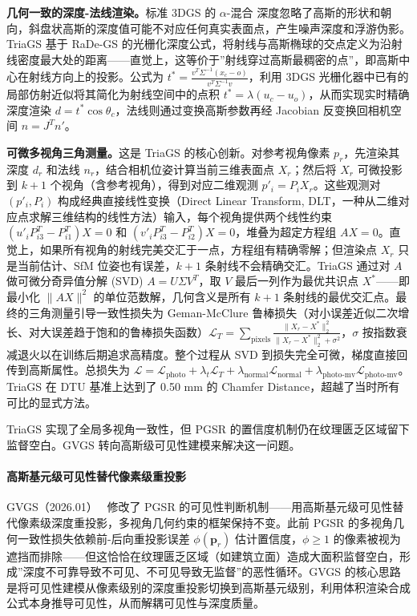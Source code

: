 \textbf{几何一致的深度-法线渲染。}标准 3DGS 的 $\alpha$-混合 深度忽略了高斯的形状和朝向，斜盘状高斯的深度值可能不对应任何真实表面点，产生噪声深度和浮游伪影。TriaGS 基于 RaDe-GS 的光栅化深度公式，将射线与高斯椭球的交点定义为沿射线密度最大处的距离——直觉上，这等价于”射线穿过高斯最稠密的点”，即高斯中心在射线方向上的投影。公式为 $t^* = \frac{v^T \Sigma^{-1}(x_c - o)}{v^T \Sigma^{-1} v}$，利用 3DGS 光栅化器中已有的局部仿射近似将其简化为射线空间中的点积 $t^* = \lambda(u_c - u_o)$，从而实现实时精确深度渲染 $d = t^* \cos\theta_c$，法线则通过变换高斯参数再经 Jacobian 反变换回相机空间 $n = J^T n'$。

\textbf{可微多视角三角测量。}这是 TriaGS 的核心创新。对参考视角像素 $p_r$，先渲染其深度 $d_r$ 和法线 $n_r$，结合相机位姿计算当前三维表面点 $X_r$；然后将 $X_r$ 可微投影到 $k+1$ 个视角（含参考视角），得到对应二维观测 $p'_i = P_i X_r$。这些观测对 $(p'_i, P_i)$ 构成经典直接线性变换（Direct Linear Transform, DLT，一种从二维对应点求解三维结构的线性方法）输入，每个视角提供两个线性约束 $(u'_i P_{i3}^T - P_{i1}^T)X = 0$ 和 $(v'_i P_{i3}^T - P_{i2}^T)X = 0$，堆叠为超定方程组 $AX = 0$。直觉上，如果所有视角的射线完美交汇于一点，方程组有精确零解；但渲染点 $X_r$ 只是当前估计、SfM 位姿也有误差，$k+1$ 条射线不会精确交汇。TriaGS 通过对 $A$ 做可微分奇异值分解 (SVD) $A = U\Sigma V^T$，取 $V$ 最后一列作为最优共识点 $X^*$——即最小化 $\|AX\|^2$ 的单位范数解，几何含义是所有 $k+1$ 条射线的最优交汇点。最终的三角测量引导一致性损失为 Geman-McClure 鲁棒损失（对小误差近似二次增长、对大误差趋于饱和的鲁棒损失函数）$\mathcal{L}_T = \sum_{\text{pixels}} \frac{\|X_r - X^*\|_2^2}{\|X_r - X^*\|_2^2 + \sigma^2}$，$\sigma$ 按指数衰减退火以在训练后期追求高精度。整个过程从 SVD 到损失完全可微，梯度直接回传到高斯属性。总损失为 $\mathcal{L} = \mathcal{L}_{\text{photo}} + \lambda_t \mathcal{L}_T + \lambda_{\text{normal}} \mathcal{L}_{\text{normal}} + \lambda_{\text{photo-mv}} \mathcal{L}_{\text{photo-mv}}$。TriaGS 在 DTU 基准上达到了 0.50 mm 的 Chamfer Distance，超越了当时所有可比的显式方法。

TriaGS 实现了全局多视角一致性，但 PGSR 的置信度机制仍在纹理匮乏区域留下监督空白。GVGS 转向高斯级可见性建模来解决这一问题。

\paragraph{高斯基元级可见性替代像素级重投影}

GVGS（2026.01）~\cite{2601_20331} 修改了 PGSR 的可见性判断机制——用高斯基元级可见性替代像素级深度重投影，多视角几何约束的框架保持不变。此前 PGSR 的多视角几何一致性损失依赖前-后向重投影误差 $\phi(\bm{p}_r)$ 估计置信度，$\phi \geq 1$ 的像素被视为遮挡而排除——但这恰恰在纹理匮乏区域（如建筑立面）造成大面积监督空白，形成”深度不可靠导致不可见、不可见导致无监督”的恶性循环。GVGS 的核心思路是将可见性建模从像素级别的深度重投影切换到高斯基元级别，利用体积渲染合成公式本身推导可见性，从而解耦可见性与深度质量。


